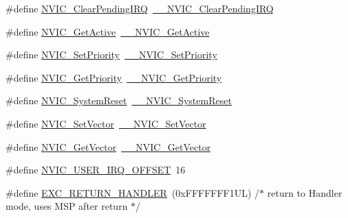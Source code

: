 \begin{DoxyCompactItemize}
\#define \hyperlink{group___c_m_s_i_s___core___n_v_i_c_functions_ga590cf113000a079b1f0ea3dcd5b5316c}{N\+V\+I\+C\+\_\+\+Clear\+Pending\+I\+RQ}~\hyperlink{group___c_m_s_i_s___core___n_v_i_c_functions_ga562a86dbdf14827d0fee8fdafb04d191}{\+\_\+\+\_\+\+N\+V\+I\+C\+\_\+\+Clear\+Pending\+I\+RQ}
\item 
\#define \hyperlink{group___c_m_s_i_s___core___n_v_i_c_functions_ga58ad3f352f832235ab3b192ff4745320}{N\+V\+I\+C\+\_\+\+Get\+Active}~\hyperlink{group___c_m_s_i_s___core___n_v_i_c_functions_gaa2837003c28c45abf193fe5e8d27f593}{\+\_\+\+\_\+\+N\+V\+I\+C\+\_\+\+Get\+Active}
\item 
\#define \hyperlink{group___c_m_s_i_s___core___n_v_i_c_functions_gae0e9d0e2f7b6133828c71b57d4941c35}{N\+V\+I\+C\+\_\+\+Set\+Priority}~\hyperlink{group___c_m_s_i_s___core___n_v_i_c_functions_ga505338e23563a9c074910fb14e7d45fd}{\+\_\+\+\_\+\+N\+V\+I\+C\+\_\+\+Set\+Priority}
\item 
\#define \hyperlink{group___c_m_s_i_s___core___n_v_i_c_functions_gaf59b9d0a791d2157abb319753953eceb}{N\+V\+I\+C\+\_\+\+Get\+Priority}~\hyperlink{group___c_m_s_i_s___core___n_v_i_c_functions_gaeb9dc99c8e7700668813144261b0bc73}{\+\_\+\+\_\+\+N\+V\+I\+C\+\_\+\+Get\+Priority}
\item 
\#define \hyperlink{group___c_m_s_i_s___core___n_v_i_c_functions_ga6aa0367d3642575610476bf0366f0c48}{N\+V\+I\+C\+\_\+\+System\+Reset}~\hyperlink{group___c_m_s_i_s___core___n_v_i_c_functions_ga0d9aa2d30fa54b41eb780c16e35b676c}{\+\_\+\+\_\+\+N\+V\+I\+C\+\_\+\+System\+Reset}
\item 
\#define \hyperlink{group___c_m_s_i_s___core___n_v_i_c_functions_ga804af63bb4c4c317387897431814775d}{N\+V\+I\+C\+\_\+\+Set\+Vector}~\hyperlink{group___c_m_s_i_s___core___n_v_i_c_functions_ga0df355460bc1783d58f9d72ee4884208}{\+\_\+\+\_\+\+N\+V\+I\+C\+\_\+\+Set\+Vector}
\item 
\#define \hyperlink{group___c_m_s_i_s___core___n_v_i_c_functions_ga955eb1c33a3dcc62af11a8385e8c0fc8}{N\+V\+I\+C\+\_\+\+Get\+Vector}~\hyperlink{group___c_m_s_i_s___core___n_v_i_c_functions_ga44b665d2afb708121d9b10c76ff00ee5}{\+\_\+\+\_\+\+N\+V\+I\+C\+\_\+\+Get\+Vector}
\item 
\#define \hyperlink{group___c_m_s_i_s___core___n_v_i_c_functions_ga8045d905a5ca57437d8e6f71ffcb6df5}{N\+V\+I\+C\+\_\+\+U\+S\+E\+R\+\_\+\+I\+R\+Q\+\_\+\+O\+F\+F\+S\+ET}~16
\item 
\#define \hyperlink{group___c_m_s_i_s___core___n_v_i_c_functions_gaa6fa2b10f756385433e08522d9e4632f}{E\+X\+C\+\_\+\+R\+E\+T\+U\+R\+N\+\_\+\+H\+A\+N\+D\+L\+ER}~(0x\+F\+F\+F\+F\+F\+F\+F1\+U\+L)     /$\ast$ return to Handler mode, uses M\+S\+P after return                               $\ast$/

\end{DoxyCompactItemize}
